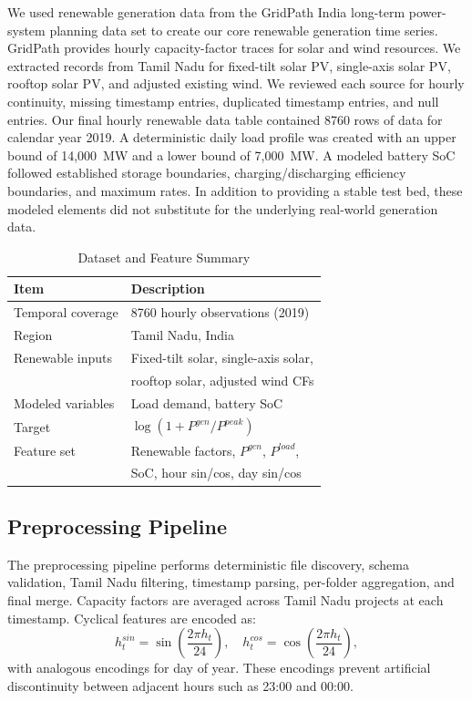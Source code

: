 \documentclass{ieeeaccess}
\begin{document}
We used renewable generation data from the GridPath India long-term power-system planning data set to create our core renewable generation time series. GridPath provides hourly capacity-factor traces for solar and wind resources. We extracted records from Tamil Nadu for fixed-tilt solar PV, single-axis solar PV, rooftop solar PV, and adjusted existing wind. We reviewed each source for hourly continuity, missing timestamp entries, duplicated timestamp entries, and null entries. Our final hourly renewable data table contained 8760 rows of data for calendar year 2019. A deterministic daily load profile was created with an upper bound of 14{,}000~MW and a lower bound of 7{,}000~MW. A modeled battery SoC followed established storage boundaries, charging/discharging efficiency boundaries, and maximum rates. In addition to providing a stable test bed, these modeled elements did not substitute for the underlying real-world generation data.
\begin{table}[!t]
\caption{Dataset and Feature Summary}
\label{tab:dataset_summary}
\centering
\begin{tabular}{ll}
\toprule
Item & Description \\
\midrule
Temporal coverage & 8760 hourly observations (2019) \\
Region & Tamil Nadu, India \\
Renewable inputs & Fixed-tilt solar, single-axis solar, \\
 & rooftop solar, adjusted wind CFs \\
Modeled variables & Load demand, battery SoC \\
Target & $\log(1 + P^{gen}/P^{peak})$ \\
Feature set & Renewable factors, $P^{gen}$, $P^{load}$, \\
 & SoC, hour sin/cos, day sin/cos \\
\bottomrule
\end{tabular}
\end{table}

\subsection{Preprocessing Pipeline}
The preprocessing pipeline performs deterministic file discovery, schema validation, Tamil Nadu filtering, timestamp parsing, per-folder aggregation, and final merge. Capacity factors are averaged across Tamil Nadu projects at each timestamp. Cyclical features are encoded as:
\begin{equation}
h^{sin}_t = \sin\left(\frac{2\pi h_t}{24}\right), \quad h^{cos}_t = \cos\left(\frac{2\pi h_t}{24}\right),
\end{equation}
with analogous encodings for day of year. These encodings prevent artificial discontinuity between adjacent hours such as 23:00 and 00:00.
\end{document}
